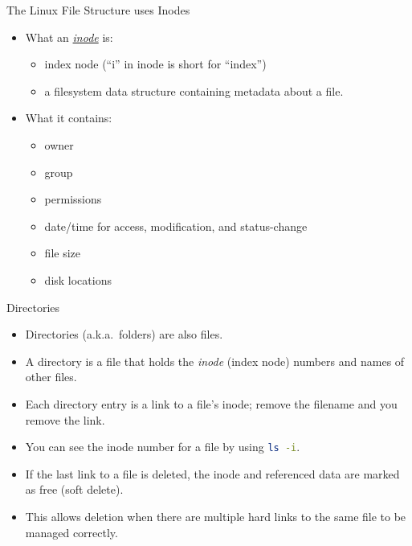 \documentclass[14pt,aspectratio=1610]{beamer}
\begin{document}
\begin{frame}{The Linux File Structure uses Inodes}

\begin{itemize}
  \item<+-> What an \href{https://en.wikipedia.org/wiki/Inode}{\emph{inode}} is:
  \begin{itemize}
    \item index node (``i'' in inode is short for ``index'')
    \item a filesystem data structure containing metadata about a file.
  \end{itemize}

  \item<+-> 
    What it contains:
    \begin{itemize}
      \item owner
      \item group
      \item permissions
      \item date/time for access, modification, and status-change
      \item file size
      \item disk locations
    \end{itemize}
\end{itemize}
\end{frame}

\begin{frame}{Directories}
\begin{itemize}[<+->]
\item Directories (a.k.a.\ folders) are also files.
\item A directory is a file that holds the \emph{inode} (index node) numbers and names of other files.
\item Each directory entry is a link to a file's inode; remove the filename and you remove the link.
\item You can see the inode number for a file by using \lstinline[language=Bash]{ls -i}.
\item If the last link to a file is deleted, the inode and referenced data are marked as free (soft delete).
\item This allows deletion when there are multiple hard links to the same file to be managed correctly.
\end{itemize}
\end{frame}
\end{document}
